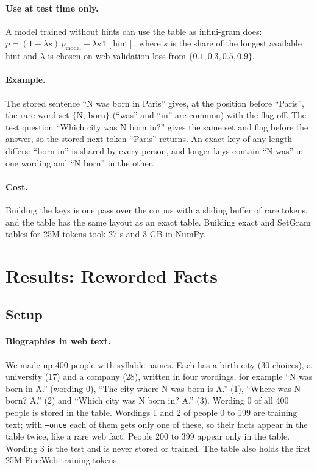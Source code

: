 \documentclass[11pt]{article}
\begin{document}
\paragraph{Use at test time only.} A model trained without hints can use the table as infini-gram does: $p=(1-\lambda s)\,p_{\text{model}}+\lambda s\,\mathbb{1}[\text{hint}]$, where $s$ is the share of the longest available hint and $\lambda$ is chosen on web validation loss from $\{0.1,0.3,0.5,0.9\}$.

\paragraph{Example.} The stored sentence ``N was born in Paris'' gives, at the position before ``Paris'', the rare-word set $\{$N, born$\}$ (``was'' and ``in'' are common) with the flag off. The test question ``Which city was N born in?'' gives the same set and flag before the answer, so the stored next token ``Paris'' returns. An exact key of any length differs: ``born in'' is shared by every person, and longer keys contain ``N was'' in one wording and ``N born'' in the other.

\paragraph{Cost.} Building the keys is one pass over the corpus with a sliding buffer of rare tokens, and the table has the same layout as an exact table. Building exact and SetGram tables for 25M tokens took 27 s and 3 GB in NumPy.

\section{Results: Reworded Facts}\label{sec:setresults}
\subsection{Setup}
\paragraph{Biographies in web text.} We made up 400 people with syllable names. Each has a birth city (30 choices), a university (17) and a company (28), written in four wordings, for example ``N was born in A.'' (wording 0), ``The city where N was born is A.'' (1), ``Where was N born? A.'' (2) and ``Which city was N born in? A.'' (3). Wording 0 of all 400 people is stored in the table. Wordings 1 and 2 of people 0 to 199 are training text; with \texttt{--once} each of them gets only one of these, so their facts appear in the table twice, like a rare web fact. People 200 to 399 appear only in the table. Wording 3 is the test and is never stored or trained. The table also holds the first 25M FineWeb training tokens.
\end{document}
